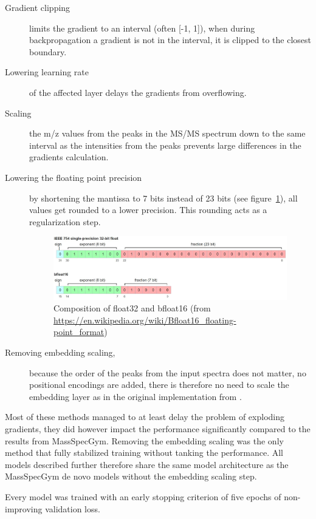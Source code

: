\begin{description}
    \item[Gradient clipping]limits the gradient to an interval (often [-1, 1]),
    when during backpropagation a gradient is not in the interval,
    it is clipped to the closest boundary.
    \item[Lowering learning rate]of the affected layer delays the gradients from overflowing.
    \item[Scaling] the m/z values from the peaks in the \ac{MS/MS} spectrum down to the same interval as the intensities from the peaks prevents large differences in the gradients calculation.
    \item[Lowering the floating point precision]by shortening the mantissa to 7 bits instead of 23 bits (see figure~\ref{fig:bf16}), 
    all values get rounded to a lower precision. This rounding acts as a regularization step.
    \begin{figure}[h]
        \centering
        \includegraphics[width=\linewidth]{figures/methods/bf16.JPG}
        \caption{Composition of float32 and bfloat16 (from \url{https://en.wikipedia.org/wiki/Bfloat16_floating-point_format})}
        \label{fig:bf16}
    \end{figure}
    \item[Removing embedding scaling,]because the order of the peaks from the input spectra does not matter,
    no positional encodings are added, there is therefore no need to scale the embedding layer as in the original implementation from \textcite{vaswani2017attention}.
\end{description}

Most of these methods managed to at least delay the problem of exploding gradients, they did however impact the performance significantly compared to the results from MassSpecGym.
Removing the embedding scaling was the only method that fully stabilized training without tanking the performance.
All models described further therefore share the same model architecture as the MassSpecGym de novo models without the embedding scaling step.

Every model was trained with an early stopping criterion of five epochs of non-improving validation loss.

